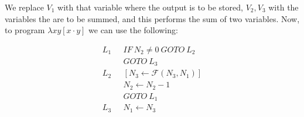 \documentclass[a4paper, 12pt]{article}
\begin{document}
We replace $V_1$ with that variable where the output is to be stored, $V_2, V_3$
with the variables the are to be summed, and this performs the sum of two
variables. Now, to program $\lambda xy[x \cdot y]$ we can use the following:

\begin{align*}
    L_1 ~ ~ ~ & IF ~ N_2 \neq 0 ~ GOTO ~ L_2 \\ 
              & GOTO ~ L_3 \\ 
    L_2 ~ ~ ~ & \left[ N_3 \leftarrow \mathcal{F}(N_3, N_1) \right]  \\ 
              &N_2 \leftarrow  N_2 - 1 \\ 
              &GOTO ~ L_1 \\ 
    L_3 ~ ~ ~ &N_1 \leftarrow N_3
\end{align*}
\end{document}
